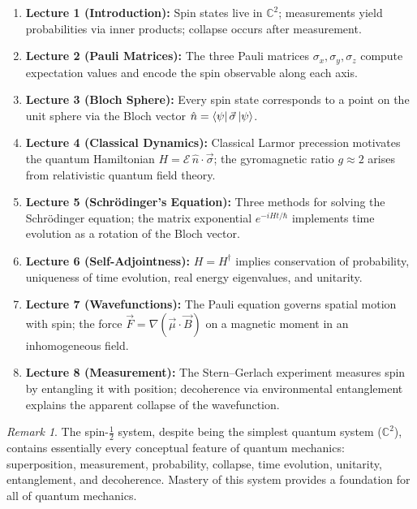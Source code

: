 \documentclass[11pt,a4paper]{article}
\theoremstyle{definition}
\theoremstyle{plain}
\theoremstyle{remark}
\newtheorem{remark}{Remark}[section]
\begin{document}
\begin{enumerate}
    \item \textbf{Lecture 1 (Introduction):} Spin states live in $\mathbb{C}^2$; measurements yield probabilities via inner products; collapse occurs after measurement.
    \item \textbf{Lecture 2 (Pauli Matrices):} The three Pauli matrices $\sigma_x, \sigma_y, \sigma_z$ compute expectation values and encode the spin observable along each axis.
    \item \textbf{Lecture 3 (Bloch Sphere):} Every spin state corresponds to a point on the unit sphere via the Bloch vector $\hat{n} = \bra{\psi}\vec{\sigma}\ket{\psi}$.
    \item \textbf{Lecture 4 (Classical Dynamics):} Classical Larmor precession motivates the quantum Hamiltonian $H = \mathcal{E}\,\hat{n}\cdot\vec{\sigma}$; the gyromagnetic ratio $g \approx 2$ arises from relativistic quantum field theory.
    \item \textbf{Lecture 5 (Schr\"odinger's Equation):} Three methods for solving the Schr\"odinger equation; the matrix exponential $e^{-iHt/\hbar}$ implements time evolution as a rotation of the Bloch vector.
    \item \textbf{Lecture 6 (Self-Adjointness):} $H = H^\dagger$ implies conservation of probability, uniqueness of time evolution, real energy eigenvalues, and unitarity.
    \item \textbf{Lecture 7 (Wavefunctions):} The Pauli equation governs spatial motion with spin; the force $\vec{F} = \nabla(\vec{\mu}\cdot\vec{B})$ on a magnetic moment in an inhomogeneous field.
    \item \textbf{Lecture 8 (Measurement):} The Stern--Gerlach experiment measures spin by entangling it with position; decoherence via environmental entanglement explains the apparent collapse of the wavefunction.
\end{enumerate}

\begin{remark}
    The spin-$\frac{1}{2}$ system, despite being the simplest quantum system ($\mathbb{C}^2$), contains essentially every conceptual feature of quantum mechanics: superposition, measurement, probability, collapse, time evolution, unitarity, entanglement, and decoherence. Mastery of this system provides a foundation for all of quantum mechanics.
\end{remark}
\end{document}
